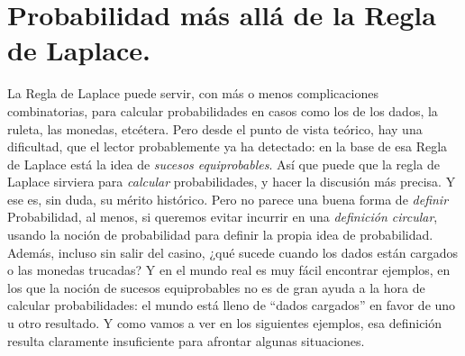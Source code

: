 \section{Probabilidad más allá de la Regla de Laplace.}
\label{cap03:sec:ProbabilidadMasAllaReglaLaplace}

La Regla de Laplace puede servir, con más o menos complicaciones combinatorias, para calcular probabilidades en casos como los de los dados, la
ruleta, las monedas, etcétera. Pero desde el punto de vista teórico, hay una dificultad, que el lector probablemente ya ha detectado: en la base de
esa Regla de Laplace está la idea de {\em sucesos equiprobables}. Así que puede que la regla de Laplace sirviera para {\em calcular} probabilidades, y
hacer la discusión más precisa. Y ese es, sin duda, su mérito histórico. Pero no parece una buena forma de {\em definir} Probabilidad, al menos, si
queremos evitar incurrir en una {\em definición circular}, usando la noción de probabilidad para definir la propia idea de probabilidad. Además, incluso sin salir del casino, ¿qué sucede cuando los dados están cargados o las monedas
trucadas? Y en el mundo real es muy fácil encontrar ejemplos, en los que la noción de sucesos equiprobables no es de gran ayuda a la hora de calcular
probabilidades: el mundo está lleno de ``dados cargados'' en favor de uno u otro resultado. Y como vamos a ver en los siguientes ejemplos, esa
definición resulta claramente insuficiente para afrontar algunas situaciones.

